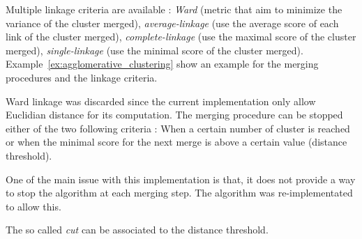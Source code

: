 Multiple linkage criteria are available : \textit{Ward} (metric that aim to minimize the variance of the cluster merged), \textit{average-linkage} (use the average score of each link of the cluster merged), \textit{complete-linkage} (use the maximal score of the cluster merged), \textit{single-linkage} (use the minimal score of the cluster merged).
Example~\ref{ex:agglomerative_clustering} show an example for the merging procedures and the linkage criteria.

Ward linkage was discarded since the current implementation only allow Euclidian distance for its computation.
The merging procedure can be stopped either of the two following criteria : When a certain number of cluster is reached or when the minimal score for the next merge is above a certain value (distance threshold).

One of the main issue with this implementation is that, it does not provide a way to stop the algorithm at each merging step.
The algorithm was re-implementated to allow this.

The so called \textit{cut} can be associated to the distance threshold.

